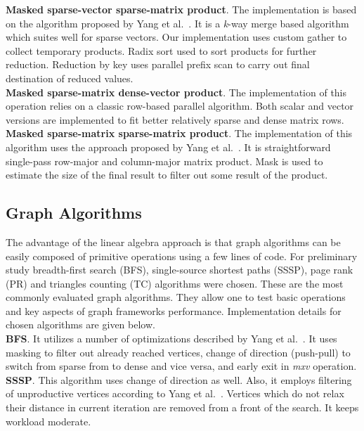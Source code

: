 \textbf{Masked sparse-vector sparse-matrix product}. The implementation is based on the algorithm proposed by Yang et al.~\cite{article:spvspm:yang}. It is a \textit{k}-way merge based algorithm which suites well for sparse vectors. Our implementation uses custom gather to collect temporary products. Radix sort used to sort products for further reduction. Reduction by key uses parallel prefix scan to carry out final destination of reduced values.\\

\textbf{Masked sparse-matrix dense-vector product}. The implementation of this operation relies on a classic row-based parallel algorithm. Both scalar and vector versions are implemented to fit better relatively sparse and dense matrix rows.\\

\textbf{Masked sparse-matrix sparse-matrix product}. The implementation of this algorithm uses the approach proposed by Yang et al.~\cite{yang2019graphblast}. It is straightforward single-pass row-major and column-major matrix product. Mask is used to estimate the size of the final result to filter out some result of the product. 

\subsection{Graph Algorithms}

The advantage of the linear algebra approach is that graph algorithms can be easily composed of primitive operations using a few lines of code. For preliminary study breadth-first search (BFS), single-source shortest paths (SSSP), page rank (PR) and triangles counting (TC) algorithms were chosen. These are the most commonly evaluated graph algorithms. They allow one to test basic operations and key aspects of graph frameworks performance. Implementation details for chosen algorithms are given below.\\

\textbf{BFS}. It utilizes a number of optimizations described by Yang et al.~\cite{article:pushpull}. It uses masking to filter out already reached vertices, change of direction (push-pull) to switch from sparse from to dense and vice versa, and early exit in \textit{mxv} operation.\\

\textbf{SSSP}. This algorithm uses change of direction as well. Also, it employs filtering of unproductive vertices according to Yang et al.~\cite{yang2019graphblast}. Vertices which do not relax their distance in current iteration are removed from a front of the search. It keeps workload moderate.\\

